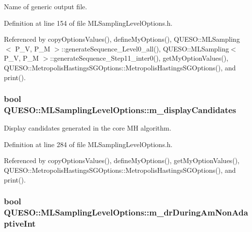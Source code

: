 Name of generic output file. 



Definition at line 154 of file M\-L\-Sampling\-Level\-Options.\-h.



Referenced by copy\-Options\-Values(), define\-My\-Options(), Q\-U\-E\-S\-O\-::\-M\-L\-Sampling$<$ P\-\_\-\-V, P\-\_\-\-M $>$\-::generate\-Sequence\-\_\-\-Level0\-\_\-all(), Q\-U\-E\-S\-O\-::\-M\-L\-Sampling$<$ P\-\_\-\-V, P\-\_\-\-M $>$\-::generate\-Sequence\-\_\-\-Step11\-\_\-inter0(), get\-My\-Option\-Values(), Q\-U\-E\-S\-O\-::\-Metropolis\-Hastings\-S\-G\-Options\-::\-Metropolis\-Hastings\-S\-G\-Options(), and print().

\hypertarget{class_q_u_e_s_o_1_1_m_l_sampling_level_options_a975a24a45096ac07b8e3a6cade590bbc}{
\subsubsection[{m\-\_\-display\-Candidates}]{\setlength{\rightskip}{0pt plus 5cm}bool Q\-U\-E\-S\-O\-::\-M\-L\-Sampling\-Level\-Options\-::m\-\_\-display\-Candidates}}\label{class_q_u_e_s_o_1_1_m_l_sampling_level_options_a975a24a45096ac07b8e3a6cade590bbc}


Display candidates generated in the core M\-H algorithm. 



Definition at line 284 of file M\-L\-Sampling\-Level\-Options.\-h.



Referenced by copy\-Options\-Values(), define\-My\-Options(), get\-My\-Option\-Values(), Q\-U\-E\-S\-O\-::\-Metropolis\-Hastings\-S\-G\-Options\-::\-Metropolis\-Hastings\-S\-G\-Options(), and print().

\hypertarget{class_q_u_e_s_o_1_1_m_l_sampling_level_options_a0824b7f76b5a6ee901f6a5edc0e130b8}{
\subsubsection[{m\-\_\-dr\-During\-Am\-Non\-Adaptive\-Int}]{\setlength{\rightskip}{0pt plus 5cm}bool Q\-U\-E\-S\-O\-::\-M\-L\-Sampling\-Level\-Options\-::m\-\_\-dr\-During\-Am\-Non\-Adaptive\-Int}}\label{class_q_u_e_s_o_1_1_m_l_sampling_level_options_a0824b7f76b5a6ee901f6a5edc0e130b8}


